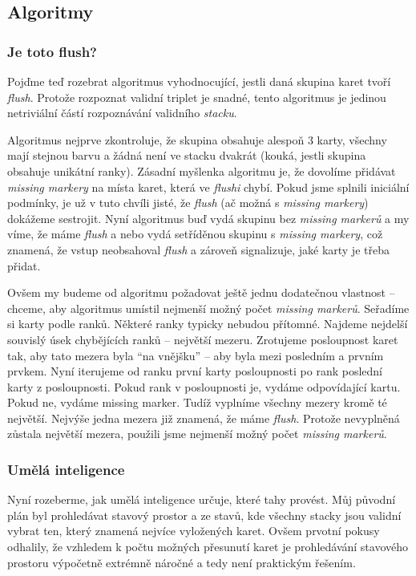 \documentclass{article}
\begin{document}
\subsection*{Algoritmy}

\subsubsection*{Je toto flush?}

Pojďme teď rozebrat algoritmus vyhodnocující, jestli daná skupina karet tvoří
\emph{flush}. Protože rozpoznat validní triplet je snadné, tento algoritmus je
jedinou netriviální částí rozpoznávání validního \emph{stacku}.

Algoritmus nejprve zkontroluje, že skupina obsahuje alespoň 3 karty, všechny
mají stejnou barvu a žádná není ve stacku dvakrát (kouká, jestli skupina
obsahuje unikátní ranky). Zásadní myšlenka algoritmu je, že dovolíme přidávat
\emph{missing markery} na místa karet, která ve \emph{flushi} chybí. Pokud jsme
splnili iniciální podmínky, je už v tuto chvíli jisté, že \emph{flush} (ač
možná s \emph{missing markery}) dokážeme sestrojit. Nyní algoritmus buď vydá
skupinu bez \emph{missing markerů} a my víme, že máme \emph{flush} a nebo vydá
setříděnou skupinu s \emph{missing markery}, což znamená, že vstup neobsahoval
\emph{flush} a zároveň signalizuje, jaké karty je třeba přidat.

Ovšem my budeme od algoritmu požadovat ještě jednu dodatečnou vlastnost --
chceme, aby algoritmus umístil nejmenší možný počet \emph{missing markerů}.
Seřadíme si karty podle ranků. Některé ranky typicky nebudou přítomné. Najdeme
nejdelší souvislý úsek chybějících ranků -- největší mezeru. Zrotujeme
posloupnost karet tak, aby tato mezera byla \enquote{na vnějšku} -- aby byla
mezi posledním a prvním prvkem. Nyní iterujeme od ranku první karty
posloupnosti po rank poslední karty z posloupnosti. Pokud rank v posloupnosti
je, vydáme odpovídající kartu. Pokud ne, vydáme missing marker. Tudíž vyplníme
všechny mezery kromě té největší. Nejvýše jedna mezera již znamená, že máme
\emph{flush}. Protože nevyplněná zůstala největší mezera, použili jsme nejmenší
možný počet \emph{missing markerů}.

\subsubsection*{Umělá inteligence}

Nyní rozeberme, jak umělá inteligence určuje, které tahy provést. Můj původní
plán byl prohledávat stavový prostor a ze stavů, kde všechny stacky jsou
validní vybrat ten, který znamená nejvíce vyložených karet. Ovšem prvotní
pokusy odhalily, že vzhledem k počtu možných přesunutí karet je prohledávání
stavového prostoru výpočetně extrémně náročné a tedy není praktickým řešením.
\end{document}
